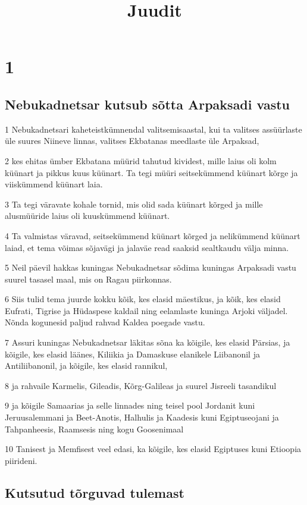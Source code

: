 

\title{Juudit}

\chapter{1}

\section*{Nebukadnetsar kutsub sõtta Arpaksadi vastu}

\par 1 Nebukadnetsari kaheteistkümnendal valitsemisaastal, kui ta valitses assüürlaste üle suures Niineve linnas, valitses Ekbatanas meedlaste üle Arpaksad,
\par 2 kes ehitas ümber Ekbatana müürid tahutud kividest, mille laius oli kolm küünart ja pikkus kuus küünart. Ta tegi müüri seitsekümmend küünart kõrge ja viiskümmend küünart laia.
\par 3 Ta tegi väravate kohale tornid, mis olid sada küünart kõrged ja mille alusmüüride laius oli kuuskümmend küünart.
\par 4 Ta valmistas väravad, seitsekümmend küünart kõrged ja nelikümmend küünart laiad, et tema võimas sõjavägi ja jalaväe read saaksid sealtkaudu välja minna.
\par 5 Neil päevil hakkas kuningas Nebukadnetsar sõdima kuningas Arpaksadi vastu suurel tasasel maal, mis on Ragau piirkonnas.
\par 6 Siis tulid tema juurde kokku kõik, kes elasid mäestikus, ja kõik, kes elasid Eufrati, Tigrise ja Hüdaspese kaldail ning eelamlaste kuninga Arjoki väljadel. Nõnda kogunesid paljud rahvad Kaldea poegade vastu.
\par 7 Assuri kuningas Nebukadnetsar läkitas sõna ka kõigile, kes elasid Pärsias, ja kõigile, kes elasid läänes, Kiliikia ja Damaskuse elanikele Liibanonil ja Antiliibanonil, ja kõigile, kes elasid rannikul,
\par 8 ja rahvaile Karmelis, Gileadis, Kõrg-Galileas ja suurel Jisreeli tasandikul
\par 9 ja kõigile Samaarias ja selle linnades ning teisel pool Jordanit kuni Jeruusalemmani ja Beet-Anotis, Halhulis ja Kaadesis kuni Egiptuseojani ja Tahpanheesis, Raamsesis ning kogu Goosenimaal
\par 10 Tanisest ja Memfisest veel edasi, ka kõigile, kes elasid Egiptuses kuni Etioopia piirideni.

\section*{Kutsutud tõrguvad tulemast}

